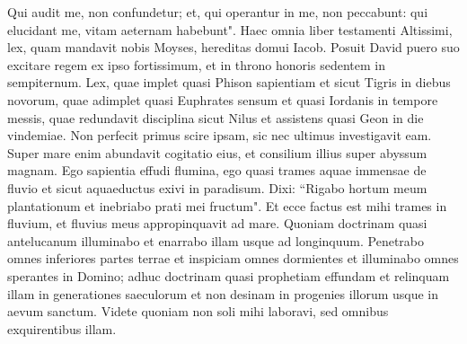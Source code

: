 \begin{biblechapter}
\verse Qui audit me, non confundetur; et, qui operantur in me, non peccabunt: 
\verse qui elucidant me, vitam aeternam habebunt". 
\verse Haec omnia liber testamenti Altissimi, 
\verse lex, quam mandavit nobis Moyses, hereditas domui Iacob. 
\verse Posuit David puero suo excitare regem ex ipso fortissimum, et in throno honoris sedentem in sempiternum. 
\verse Lex, quae implet quasi Phison sapientiam et sicut Tigris in diebus novorum, 
\verse quae adimplet quasi Euphrates sensum et quasi Iordanis in tempore messis, 
\verse quae redundavit disciplina sicut Nilus et assistens quasi Geon in die vindemiae. 
\verse Non perfecit primus scire ipsam, sic nec ultimus investigavit eam. 
\verse Super mare enim abundavit cogitatio eius, et consilium illius super abyssum magnam. 
\verse Ego sapientia effudi flumina, 
\verse ego quasi trames aquae immensae de fluvio et sicut aquaeductus exivi in paradisum. 
\verse Dixi: “Rigabo hortum meum plantationum et inebriabo prati mei fructum". 
\verse Et ecce factus est mihi trames in fluvium, et fluvius meus appropinquavit ad mare. 
\verse Quoniam doctrinam quasi antelucanum illuminabo et enarrabo illam usque ad longinquum. 
\verse Penetrabo omnes inferiores partes terrae et inspiciam omnes dormientes et illuminabo omnes sperantes in Domino; 
\verse adhuc doctrinam quasi prophetiam effundam et relinquam illam in generationes saeculorum et non desinam in progenies illorum usque in aevum sanctum. 
\verse Videte quoniam non soli mihi laboravi, sed omnibus exquirentibus illam. 
\end{biblechapter}

